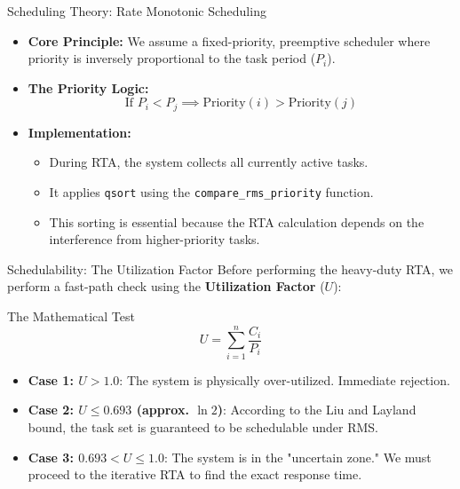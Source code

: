 \begin{frame}{Scheduling Theory: Rate Monotonic Scheduling}
    \begin{itemize}
        \item \textbf{Core Principle:} We assume a fixed-priority, preemptive scheduler where priority is inversely proportional to the task period ($P_i$).
        \item \textbf{The Priority Logic:}
        \[ \text{If } P_i < P_j \implies \text{Priority}(i) > \text{Priority}(j) \]
        \item \textbf{Implementation:} 
        \begin{itemize}
            \item During RTA, the system collects all currently active tasks.
            \item It applies \texttt{qsort} using the \texttt{compare\_rms\_priority} function.
            \item This sorting is essential because the RTA calculation depends on the interference from higher-priority tasks.
        \end{itemize}
    \end{itemize}
\end{frame}

\begin{frame}{Schedulability: The Utilization Factor}
    Before performing the heavy-duty RTA, we perform a fast-path check using the \textbf{Utilization Factor} ($U$):
    \begin{block}{The Mathematical Test}
        \[ U = \sum_{i=1}^{n} \frac{C_i}{P_i} \]
    \end{block}
    \begin{itemize}
        \item \textbf{Case 1: $U > 1.0$}: The system is physically over-utilized. Immediate rejection.
        \item \textbf{Case 2: $U \leq 0.693$ (approx. $\ln 2$)}: According to the Liu and Layland bound, the task set is guaranteed to be schedulable under RMS.
        \item \textbf{Case 3: $0.693 < U \leq 1.0$}: The system is in the "uncertain zone." We must proceed to the iterative RTA to find the exact response time.
    \end{itemize}
\end{frame}

